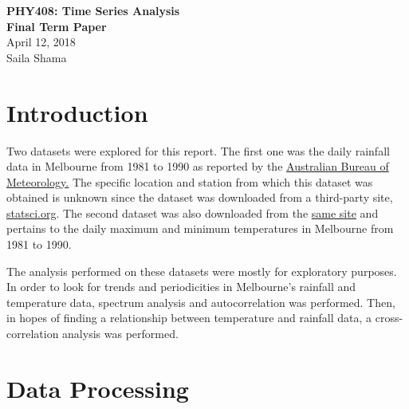 \documentclass{article}
\begin{document}
\begin{titlepage}
   \begin{center}
      \Large\textbf{PHY408: Time Series Analysis}\\
      \Large\textbf{Final Term Paper}\\ 
      \vspace{1cm}
      \large{April 12, 2018} \\ 
      \vspace{2cm}
      \large{Saila Shama} \\
	\end{center}
\end{titlepage}

\tableofcontents

\newpage
\section{Introduction}
Two datasets were explored for this report. The first one was the daily rainfall data in Melbourne from 1981 to 1990 as reported by the \href{http://www.bom.gov.au/?ref=logo}{Australian Bureau of Meteorology.} The specific location and station from which this dataset was obtained is unknown since the dataset was downloaded from a third-party site, \href{http://www.statsci.org/data/oz/melbrain.html}{statsci.org}. The second dataset was also downloaded from the \href{http://www.statsci.org/data/oz/melbtemp.html}{same site} and pertains to the daily maximum and minimum temperatures in Melbourne from 1981 to 1990.


The analysis performed on these datasets were mostly for exploratory purposes. In order to look for trends and periodicities in Melbourne's rainfall and temperature data, spectrum analysis and autocorrelation was performed. Then, in hopes of finding a relationship between temperature and rainfall data, a cross-correlation analysis was performed. 

\newpage
\section{Data Processing}
\end{document}
